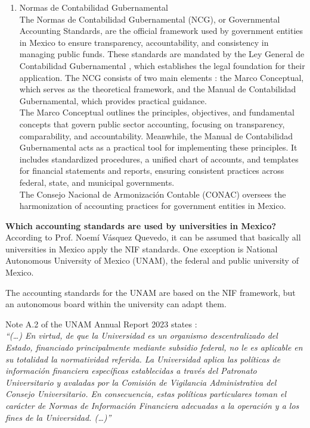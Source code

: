 \documentclass[10pt]{article}
\begin{document}
\begin{enumerate}
    \item Normas de Contabilidad Gubernamental\\
The Normas de Contabilidad Gubernamental (NCG), or Governmental Accounting Standards, are the official framework used by government entities in Mexico to ensure transparency, accountability, and consistency in managing public funds. These standards are mandated by the Ley General de Contabilidad Gubernamental \cite{LeyGeneral}, which establishes the legal foundation for their application. The NCG consists of two main elements \cite{Conac}: the Marco Conceptual, which serves as the theoretical framework, and the Manual de Contabilidad Gubernamental, which provides practical guidance.\\
The Marco Conceptual outlines the principles, objectives, and fundamental concepts that govern public sector accounting, focusing on transparency, comparability, and accountability. Meanwhile, the Manual de Contabilidad Gubernamental acts as a practical tool for implementing these principles. It includes standardized procedures, a unified chart of accounts, and templates for financial statements and reports, ensuring consistent practices across federal, state, and municipal governments.\\
The Consejo Nacional de Armonización Contable (CONAC) oversees the harmonization of accounting practices for government entities in Mexico.

\end{enumerate}

\textbf{Which accounting standards are used by universities in Mexico?}\\
According to Prof. Noemí Vásquez Quevedo, it can be assumed that basically all universities in Mexico apply the NIF standards. One exception is National Autonomous University of Mexico (UNAM), the federal and public university of Mexico.

The accounting standards for the UNAM are based on the NIF framework, but an autonomous board within the university can adapt them. 

Note A.2 of the UNAM Annual Report 2023 states \cite[p.~14]{CuentaUNAM2023}:\\
\textit{“{}(…) En virtud, de que la Universidad es un organismo descentralizado del Estado, financiado principalmente mediante subsidio federal, no le es aplicable en su totalidad la normatividad referida. La Universidad aplica las políticas de información financiera específicas establecidas a través del Patronato Universitario y avaladas por la Comisión de Vigilancia Administrativa del Consejo Universitario. En consecuencia, estas políticas particulares toman el carácter de Normas de Información Financiera adecuadas a la operación y a los fines de la Universidad. (…)”{}}
\end{document}
